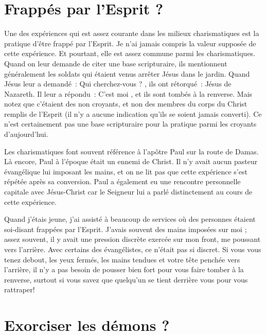 \section*{Frappés par l'Esprit ?}

Une des expériences qui est assez courante dans les milieux charismatiques
 est la pratique d'être \og frappé par l'Esprit. \fg{}
 Je n'ai jamais compris la valeur supposée de cette expérience.
 Et pourtant, elle est assez commune parmi les charismatiques.
 Quand on leur demande de citer une base scripturaire,
 ils mentionnent généralement les soldats qui étaient venus arrêter
 Jésus dans le jardin. Quand Jésus leur a demandé~:
 \og Qui cherchez-vous ? \fg{}, ils ont rétorqué~:
 \og Jésus de Nazareth. \fg{} Il leur a répondu~:
 \og C'est moi \fg{}, et ils sont tombés à la renverse.
 Mais notez que c'étaient des non croyants, et non des membres
 du corps du Christ remplis de l'Esprit (il n'y a aucune indication
 qu'ils se soient jamais converti). Ce n'est certainement pas une base
 scripturaire pour la pratique parmi les croyants d'aujourd'hui.

\begin{specialpar}{}
Les charismatiques font souvent référence à l'apôtre Paul sur la route
 de Damas. Là encore, Paul à l'époque était un ennemi de Christ.
 Il n'y avait aucun pasteur évangélique lui imposant les mains,
 et on ne lit pas que cette expérience s'est répétée après sa conversion.
 Paul a également eu une rencontre personnelle capitale avec Jésus-Christ
 car le Seigneur lui a parlé distinctement au cours de cette expérience.
\end{specialpar}

Quand j'étais jeune, j'ai assisté à beaucoup de services où des personnes
 étaient soi-disant frappées par l'Esprit.
 J'avais souvent des mains imposées sur moi ; assez souvent,
 il y avait une pression discrète exercée sur mon front,
 me poussant vers l'arrière. Avec certains des évangélistes,
 ce n'était pas si discret. Si vous vous tenez debout, les yeux fermés,
 les mains tendues et votre tête penchée vers l'arrière,
 il n'y a pas besoin de pousser bien fort pour vous faire tomber
 à la renverse, surtout si vous savez que quelqu'un se tient derrière
 vous pour vous rattraper!


\section*{Exorciser les démons ?}

